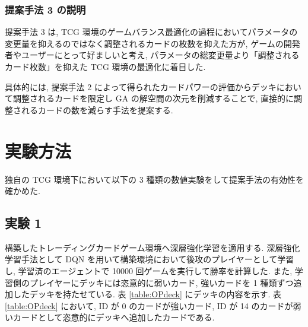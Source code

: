 \documentclass[12pt]{jarticle}
\begin{document}
\subsubsection{提案手法 3 の説明}
提案手法 3 は, TCG 環境のゲームバランス最適化の過程においてパラメータの変更量を抑えるのではなく調整されるカードの枚数を抑えた方が, ゲームの開発者やユーザーにとって好ましいと考え, パラメータの総変更量より「調整されるカード枚数」を抑えた TCG 環境の最適化に着目した.\par
具体的には, 提案手法 2 によって得られたカードパワーの評価からデッキにおいて調整されるカードを限定し GA の解空間の次元を削減することで, 直接的に調整されるカードの数を減らす手法を提案する.

\clearpage
\section{実験方法}
独自の TCG 環境下において以下の 3 種類の数値実験をして提案手法の有効性を確かめた.
\subsection{実験 1}
構築したトレーディングカードゲーム環境へ深層強化学習を適用する. 
深層強化学習手法として DQN を用いて構築環境において後攻のプレイヤーとして学習し, 学習済のエージェントで 10000 回ゲームを実行して勝率を計算した. また, 学習側のプレイヤーにデッキには恣意的に弱いカード, 強いカードを 1 種類ずつ追加したデッキを持たせている. 表 \ref{table:OPdeck} にデッキの内容を示す. 表 \ref{table:OPdeck} において, ID が 0 のカードが強いカード, ID が 14 のカードが弱いカードとして恣意的にデッキへ追加したカードである.
\end{document}
